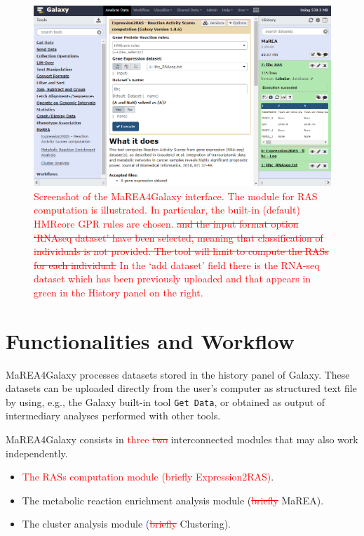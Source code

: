 \documentclass[preprint,12pt,authoryear]{elsarticle}
\newcommand{\red}{\textcolor{red}}
\newcommand{\mareagalaxy}{\textsf{MaREA4Galaxy}}
\newcommand{\mareaTool}{\textsf{MaREA}}
\newcommand{\clusterTool}{\textsf{Clustering}}
\newcommand{\RASTool}{\textsf{Expression2RAS}}
\begin{document}
\begin{figure}[ht]
  \includegraphics[width=1\textwidth]{figs/screenshot1v2q.png}
  \caption{\red{Screenshot of the \mareagalaxy{} interface. The module
      for RAS computation is illustrated. In particular, the built-in
      (default) HMRcore GPR rules are chosen. \sout{and the input
        format option `RNAseq dataset' have been selected, meaning
        that classification of individuals is not provided. The tool
        will limit to compute the RASs for each individual.} In the
      `add dataset' field there is the RNA-seq dataset which has been
      previously uploaded and that appears in green in the History
      panel on the right.}}
  \label{fig:screenshot1}
\end{figure}

 
\section{Functionalities and Workflow}

\mareagalaxy{} processes datasets stored in the history panel of
Galaxy. These datasets can be uploaded directly from the user's
computer as structured text file by using, e.g., the Galaxy built-in
tool \texttt{Get Data}, or obtained as output of intermediary analyses
performed with other tools.
 
\mareagalaxy{} consists in \red{three \sout{two}} interconnected
modules that may also work independently.
\begin{itemize}
\item \red{The RASs computation module (briefly \RASTool{})}.
\item The metabolic reaction enrichment analysis module
  (\red{\sout{briefly}} \mareaTool{}).
\item The cluster analysis module (\red{\sout{briefly}}
  \clusterTool{}).
\end{itemize}
\end{document}
